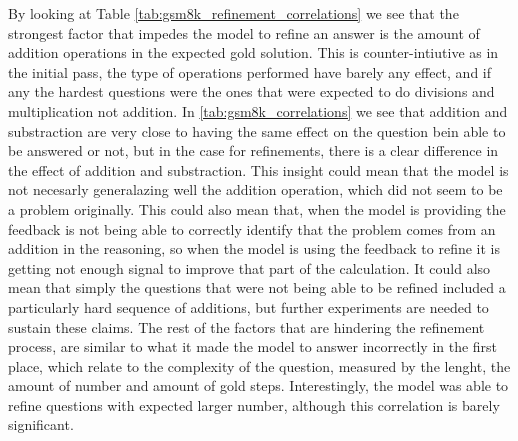 \documentclass[a4paper,10pt]{article}
\begin{document}
By looking at Table \ref{tab:gsm8k_refinement_correlations} we see that the strongest factor that impedes the model to refine an answer is the amount of addition operations in the expected gold solution. This is counter-intiutive as in the initial pass, the type of operations performed have barely any effect, and if any the hardest questions were the ones that were expected to do divisions and multiplication not addition. In \ref{tab:gsm8k_correlations} we see that addition and substraction are very close to having the same effect on the question bein able to be answered or not, but in the case for refinements, there is a clear difference in the effect of addition and substraction. This insight could mean that the model is not necesarly generalazing well the addition operation, which did not seem to be a problem originally. This could also mean that, when the model is providing the feedback is not being able to correctly identify that the problem comes from an addition in the reasoning, so when the model is using the feedback to refine it is getting not enough signal to improve that part of the calculation. It could also mean that simply the questions that were not being able to be refined included a particularly hard sequence of additions, but further experiments are needed to sustain these claims. The rest of the factors that are hindering the refinement process, are similar to what it made the model to answer incorrectly in the first place, which relate to the complexity of the question, measured by the lenght, the amount of number and amount of gold steps. Interestingly, the model was able to refine questions with expected larger number, although this correlation is barely significant.
\end{document}
